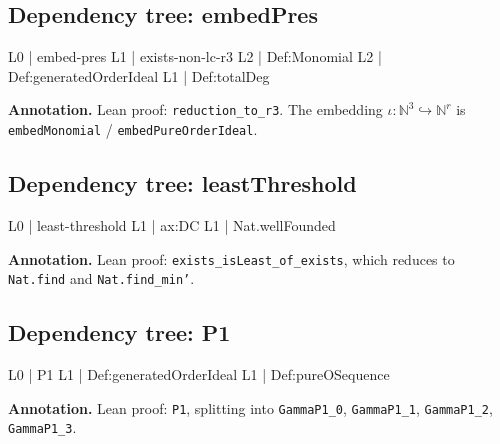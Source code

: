 \documentclass[11pt,reqno]{amsart}
\providecommand{\N}{\mathbb{N}}
\begin{document}
\medskip

\subsection*{Dependency tree: \textsf{embedPres}}

\noindent%
\begin{minipage}[t]{0.48\linewidth}
	\vspace{0pt}
	\begin{verbatimbox}
		L0 | embed-pres
		L1 |   exists-non-lc-r3
		L2 |     Def:Monomial
		L2 |     Def:generatedOrderIdeal
		L1 |   Def:totalDeg
	\end{verbatimbox}
\end{minipage}\hfill 
\begin{minipage}[t]{0.48\linewidth}
	\vspace{0pt}
	\textbf{Annotation.} Lean proof: \texttt{reduction\_to\_r3}. The embedding $\iota:\N^{3}\hookrightarrow\N^{r}$ is \texttt{embedMonomial} / \texttt{embedPureOrderIdeal}.
\end{minipage}

\medskip

\subsection*{Dependency tree: \textsf{leastThreshold}}

\noindent%
\begin{minipage}[t]{0.48\linewidth}
	\vspace{0pt}
	\begin{verbatimbox}
		L0 | least-threshold
		L1 |   ax:DC
		L1 |   Nat.wellFounded
	\end{verbatimbox}
\end{minipage}\hfill 
\begin{minipage}[t]{0.48\linewidth}
	\vspace{0pt}
	\textbf{Annotation.} Lean proof: \texttt{exists\_isLeast\_of\_exists}, which reduces to \texttt{Nat.find} and \texttt{Nat.find\_min'}.
\end{minipage}

\medskip

\subsection*{Dependency tree: \textsf{P1}}

\noindent%
\begin{minipage}[t]{0.48\linewidth}
	\vspace{0pt}
	\begin{verbatimbox}
		L0 | P1
		L1 |   Def:generatedOrderIdeal
		L1 |   Def:pureOSequence
	\end{verbatimbox}
\end{minipage}\hfill 
\begin{minipage}[t]{0.48\linewidth}
	\vspace{0pt}
	\textbf{Annotation.} Lean proof: \texttt{P1}, splitting into \texttt{GammaP1\_0}, \texttt{GammaP1\_1}, \texttt{GammaP1\_2}, \texttt{GammaP1\_3}.
\end{minipage}
\end{document}
